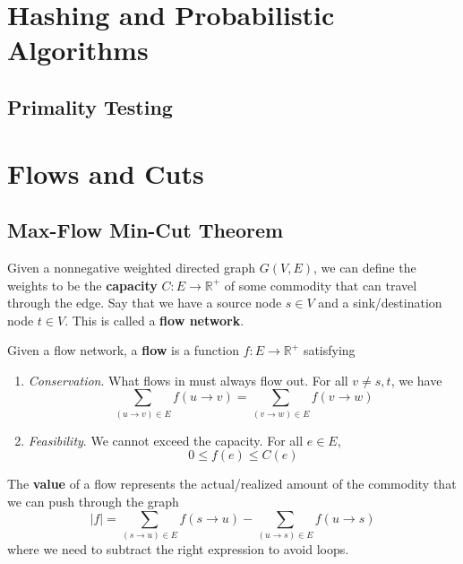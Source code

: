 \documentclass{article}
\begin{document}
\section{Hashing and Probabilistic Algorithms} 

  \subsection{Primality Testing}

\section{Flows and Cuts} 

  \subsection{Max-Flow Min-Cut Theorem} 

    \begin{definition}
      Given a nonnegative weighted directed graph $G(V, E)$, we can define the weights to be the \textbf{capacity} $C: E \rightarrow \mathbb{R}^+$ of some commodity that can travel through the edge. Say that we have a source node $s \in V$ and a sink/destination node $t \in V$. This is called a \textbf{flow network}.
    \end{definition}

    \begin{definition}[Flow]
      Given a flow network, a \textbf{flow} is a function $f: E \rightarrow \mathbb{R}^+$ satisfying 
      \begin{enumerate}
        \item \textit{Conservation}. What flows in must always flow out. For all $v \neq s, t$, we have 
          \begin{equation}
            \sum_{(u \rightarrow v) \in E} f(u \rightarrow v) = \sum_{(v \rightarrow w) \in E} f(v \rightarrow w)
          \end{equation}

        \item \textit{Feasibility}. We cannot exceed the capacity. For all $e \in E$, 
          \begin{equation}
            0 \leq f(e) \leq C(e)
          \end{equation}
      \end{enumerate}
      The \textbf{value} of a flow represents the actual/realized amount of the commodity that we can push through the graph
      \begin{equation}
        |f| = \sum_{(s \rightarrow u) \in E}  f(s \rightarrow u) - \sum_{(u \rightarrow s) \in E}  f(u \rightarrow s) 
      \end{equation} 
      where we need to subtract the right expression to avoid loops. 
    \end{definition}
\end{document}
